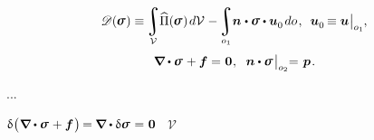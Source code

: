 \nopagebreak\begin{equation}\label{complementaryenergyfunctional}
\mathscr{D} (\hspace{-0.1ex}\linearstress\hspace{.1ex}) \equiv \hspace{-0.2ex}
\displaystyle \integral\displaylimits_{\mathcal{V}} \hspace{-0.5ex}
\widehat{\Pi}(\hspace{-0.1ex}\linearstress\hspace{.1ex}) \hspace{.25ex} d\mathcal{V} \hspace{.1ex}
- \hspace{-0.2ex}
\integral\displaylimits_{o_1} \hspace{-0.5ex} \bm{n} \hspace{.1ex} \dotp \linearstress \dotp \bm{u}_{\raisemath{-0.1em}{0}} \hspace{.25ex} do
\hspace{.2ex} ,
\hspace{.5em}
\bm{u}_{\raisemath{-0.1em}{0}} \hspace{-0.2ex} \equiv \bm{u} \hspace{.1ex} \bigr|_{o_1}
\hspace{-0.1ex} ,
\end{equation}
%
\nopagebreak\vspace{-0.4em}\begin{equation*}
\boldnabla \dotp \linearstress \hspace{.15ex} + \bm{f} = \hspace{.1ex} \bm{0} \hspace{.1ex} ,
\hspace{.6em}
\bm{n} \dotp \linearstress \hspace{.2ex} \bigr|_{o_2} \hspace{-0.66ex} = \hspace{.2ex} \bm{p}
\hspace{.2ex} .
\end{equation*}

...

${
\variation{\hspace{.1ex} \bigl( \hspace{.1ex} \boldnabla \dotp \linearstress \hspace{.15ex} + \bm{f} \hspace{.15ex} \bigr)} \hspace{-0.2ex}
= \hspace{-0.1ex} \boldnabla \dotp \variation{\linearstress} \hspace{.15ex}
= \hspace{.1ex} \bm{0}
}$ ~$\mathcal{V}$

